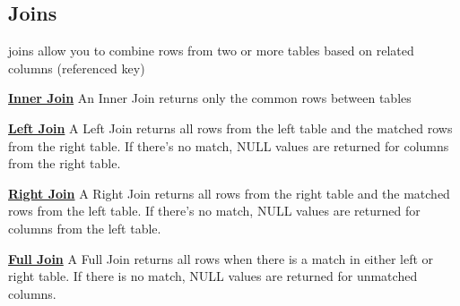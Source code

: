 \subsection{Joins}
\begin{tcolorbox}[title = Definition]
joins allow you to combine rows from two or more tables based on related columns (referenced key)

\textbf{\underline{Inner Join}}
An Inner Join returns only the common rows between tables
\begin{center}
\end{center}
\textbf{\underline{Left Join}}
A Left Join returns all rows from the left table and the matched rows from the right table. If there’s no match,
NULL values are returned for columns from the right table.

\begin{center}
\end{center}
\textbf{\underline{Right Join}}
A Right Join returns all rows from the right table and the matched rows from the left table. If there’s no match,
NULL values are returned for columns from the left table.
\begin{center}
\end{center}
\textbf{\underline{Full Join}}
A Full Join returns all rows when there is a match in either left or right table. If there is no match,
NULL values are returned for unmatched columns.
\begin{center}
\end{center}
\end{tcolorbox}


